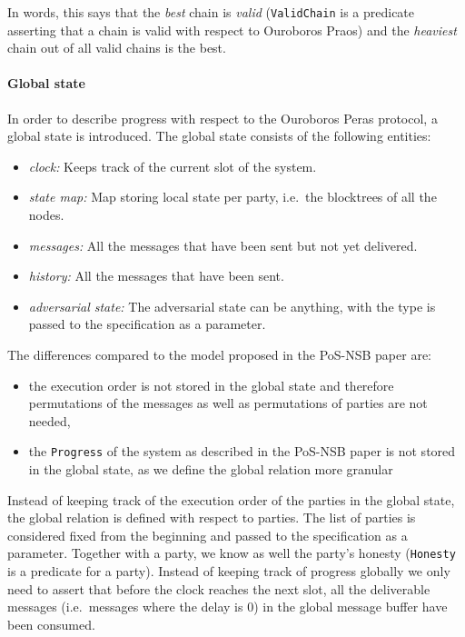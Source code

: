 \documentclass[10pt]{article}
\providecommand{\tightlist}{%
  \setlength{\itemsep}{0pt}\setlength{\parskip}{0pt}}
\begin{document}
In words, this says that the \emph{best} chain is \emph{valid}
(\texttt{ValidChain} is a predicate asserting that a chain is valid with
respect to Ouroboros Praos) and the \emph{heaviest} chain out of all
valid chains is the best.

\paragraph{Global state}\label{global-state}

In order to describe progress with respect to the Ouroboros Peras
protocol, a global state is introduced. The global state consists of the
following entities:

\begin{itemize}
\tightlist
\item
  \emph{clock:} Keeps track of the current slot of the system.
\item
  \emph{state map:} Map storing local state per party, i.e.~the
  blocktrees of all the nodes.
\item
  \emph{messages:} All the messages that have been sent but not yet
  delivered.
\item
  \emph{history:} All the messages that have been sent.
\item
  \emph{adversarial state:} The adversarial state can be anything, with
  the type is passed to the specification as a parameter.
\end{itemize}

The differences compared to the model proposed in the PoS-NSB paper are:

\begin{itemize}
\tightlist
\item
  the execution order is not stored in the global state and therefore
  permutations of the messages as well as permutations of parties are
  not needed,
\item
  the \texttt{Progress} of the system as described in the PoS-NSB paper
  is not stored in the global state, as we define the global relation
  more granular
\end{itemize}

Instead of keeping track of the execution order of the parties in the
global state, the global relation is defined with respect to parties.
The list of parties is considered fixed from the beginning and passed to
the specification as a parameter. Together with a party, we know as well
the party's honesty (\texttt{Honesty} is a predicate for a party).
Instead of keeping track of progress globally we only need to assert
that before the clock reaches the next slot, all the deliverable
messages (i.e.~messages where the delay is 0) in the global message
buffer have been consumed.
\end{document}
